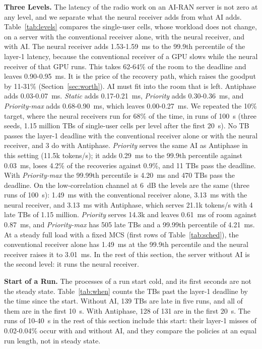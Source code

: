 \documentclass[acmsmall,screen,review,anonymous]{acmart}
\newcommand{\sys}{Antiphase\xspace}
\begin{document}
\noindent\textbf{Three Levels.} The latency of the radio work on an AI-RAN server is not zero at any level,
and we separate what the neural receiver adds from what AI adds. Table~\ref{tab:levels} compares the
single-user cells, whose workload does not change, on a server with the conventional receiver alone, with the
neural receiver, and with AI. The neural receiver adds 1.53-1.59~ms to the 99.9th percentile of the layer-1
latency, because the conventional receiver of a GPU slows while the neural receiver of that GPU runs. This
takes 62-64\% of the room to the deadline and leaves 0.90-0.95~ms. It is the price of the recovery path,
which raises the goodput by 11-31\% (Section~\ref{sec:worth}). AI must fit into the room that is left. \sys
adds 0.03-0.07~ms. \textit{Static} adds 0.17-0.21~ms, \textit{Priority} adds 0.30-0.36~ms, and
\textit{Priority-max} adds 0.68-0.90~ms, which leaves 0.00-0.27~ms. We repeated the 10\% target, where the
neural receivers run for 68\% of the time, in runs of 100~s (three seeds, 1.15 million TBs of single-user
cells per level after the first 20~s). No TB passes the layer-1 deadline with the conventional receiver alone
or with the neural receiver, and 3 do with \sys. \textit{Priority} serves the same AI as \sys in this
setting (11.5k tokens/s); it adds 0.29~ms to the 99.9th percentile against 0.03~ms, loses 4.2\% of the
recoveries against 0.9\%, and 11 TBs pass the deadline. With \textit{Priority-max} the 99.99th percentile is
4.20~ms and 470 TBs pass the deadline. On the low-correlation channel at 6~dB the levels are the same (three
runs of 100~s): 1.49~ms with the conventional receiver alone, 3.13~ms with the neural receiver, and 3.13~ms
with \sys, which serves 21.1k tokens/s with 4 late TBs of 1.15 million. \textit{Priority} serves 14.3k and
leaves 0.61~ms of room against 0.87~ms, and \textit{Priority-max} has 505 late TBs and a 99.99th percentile of
4.21~ms. At a steady full load with a fixed MCS (first rows of
Table~\ref{tab:sched}), the conventional receiver alone has 1.49~ms at the 99.9th percentile and the neural
receiver raises it to 3.01~ms. In the rest of this section, the server without AI is the second level: it
runs the neural receiver.

\noindent\textbf{Start of a Run.} The processes of a run start cold, and its first seconds are not the steady
state. Table~\ref{tab:when} counts the TBs past the layer-1 deadline by the time since the start. Without
AI, 139 TBs are late in five runs, and all of them are in the first 10~s. With \sys, 128 of 131 are in the
first 20~s. The runs of 10-40~s in the rest of this section include this start: their layer-1 misses of
0.02-0.04\% occur with and without AI, and they compare the policies at an equal run length, not in steady
state.
\end{document}
